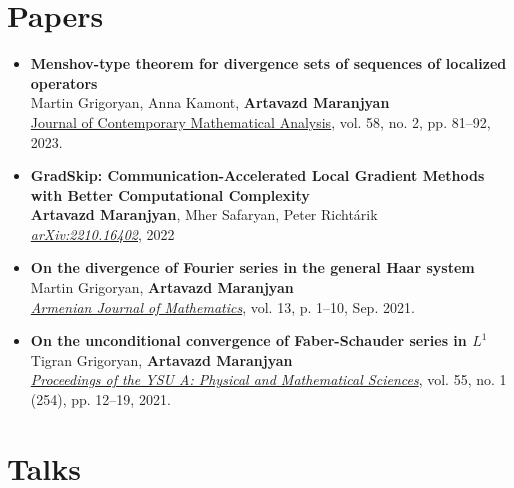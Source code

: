 \documentclass[11pt,a4paper,sans]{moderncv}        %
\begin{document}
\section{Papers}
\begin{itemize}

\item \textbf{Menshov-type theorem for divergence sets of sequences of localized operators}\\
Martin Grigoryan, Anna Kamont, \textbf{Artavazd Maranjyan}\\
\href{https://doi.org/10.3103/S106836232302005X}{Journal of Contemporary Mathematical Analysis}, vol. 58, no. 2, pp. 81–92, 2023.

\vspace{2mm}

\item \textbf{GradSkip: Communication-Accelerated Local Gradient Methods with Better Computational Complexity}\\
\textbf{Artavazd Maranjyan}, Mher Safaryan, Peter Richtárik\\
\textcolor{accent}{\href{https://arxiv.org/abs/2210.16402}{\textit{arXiv:2210.16402}}}, 2022

\vspace{2mm}

\item \textbf{On the divergence of Fourier series in the general Haar system}\\
Martin Grigoryan, \textbf{Artavazd Maranjyan}\\ \textcolor{accent}{\href{https://doi.org/10.52737/18291163-2021.13.6-1-10}{\textit{Armenian Journal of Mathematics}}}, vol. 13, p. 1–10, Sep. 2021.

\vspace{2mm}

\item \textbf{On the unconditional convergence of Faber-Schauder series in $L^1$}\\
Tigran Grigoryan, \textbf{Artavazd Maranjyan}\\
\textcolor{accent}{\href{http://www.old.ysu.am/files/vol55\_no1\_2021\_pp12\%E2\%80\%9319.pdf}{\textit{Proceedings of the YSU A: Physical and Mathematical Sciences}}}, vol. 55, no. 1 (254), pp. 12–19, 2021.
\end{itemize}


\section{Talks}
\vspace{4pt}
\end{document}
